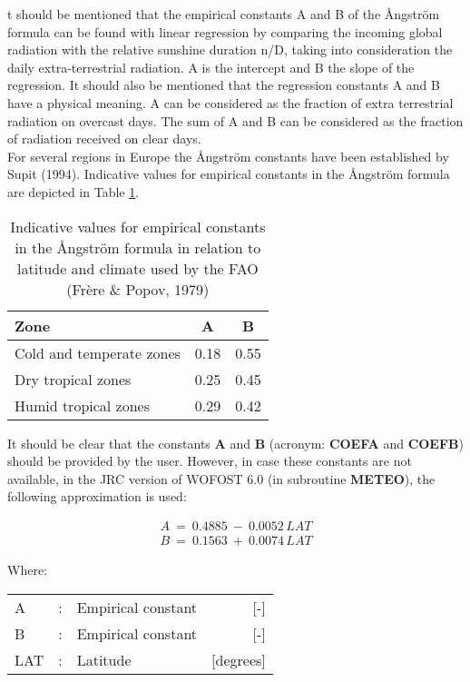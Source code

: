 \documentclass[11pt]{report}
\begin{document}
t should be mentioned that the empirical constants A and B of the \AA ngstr\"{o}m formula can be found with linear regression by comparing the incoming global radiation with the
relative sunshine duration n/D, taking into consideration the daily extra-terrestrial
radiation. A is the intercept and B the slope of the regression. It should also be mentioned
that the regression constants A and B have a physical meaning. A can be considered as
the fraction of extra terrestrial radiation on overcast days. The sum of A and B can be
considered as the fraction of radiation received on clear days.\\
For several regions in Europe the \AA ngstr\"{o}m constants have been established by Supit
(1994). Indicative values for empirical constants in the \AA ngstr\"{o}m formula are depicted in Table \ref{tab:angstAB}.

\begin{table}
\caption{Indicative values for empirical constants in the \AA ngstr\"{o}m formula in
relation to latitude and climate used by the FAO (Fr\`{e}re \& Popov, 1979)}
\label{tab:angstAB}
\begin{tabular}{lcc}
\hline
Zone &   A &  B                \\
\hline
Cold and temperate zones   &  0.18 &  0.55\\
Dry tropical zones  &   0.25  & 0.45\\
Humid tropical zones  &   0.29 &  0.42\\
\hline
\end{tabular}
\end{table}

It should be clear that the constants {\bf A} and {\bf B} (acronym: {\bf COEFA} and {\bf COEFB}) should be
provided by the user. However, in case these constants are not available, in the JRC
version of WOFOST 6.0 (in subrou\-tine {\bf METEO}), the following approximation is used:

\begin{eqnarray*}
 A~=~0.4885~-~0.0052 \, LAT \\
 B~=~0.1563~+~0.0074 \, LAT 
\end{eqnarray*}

Where:\\
\begin{tabularx}{\textwidth}{llXr}
A &:& Empirical constant  & [-]\\
B &:& Empirical constant  & [-]\\
LAT &:& Latitude  & [degrees]\\
\end{tabularx}
\end{document}
